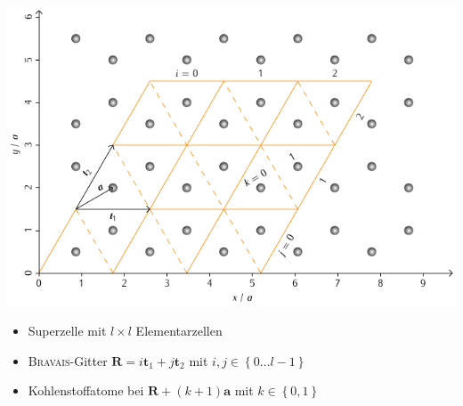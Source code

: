 \documentclass{beamer}
\newcommand \braces[1]{\left \lbrace #1 \right \rbrace}
\def \vec {\boldsymbol}
\begin{document}
	\begin{frame}
		\includegraphics[width=\textwidth]{Abbildungen/Raumstrukturen/Orientierung.pdf}
		\begin{itemize}
			\item Superzelle mit $l \times l$ Elementarzellen
			\item \textsc{Bravais}-Gitter $\vec R = i \vec t_1 + j \vec t_2$ mit $i, j \in \braces{0 \dots l - 1}$
			\item Kohlenstoffatome bei $\vec R + (k + 1) \vec a$ mit $k \in \braces{0, 1}$
		\end{itemize}
	\end{frame}
\end{document}
